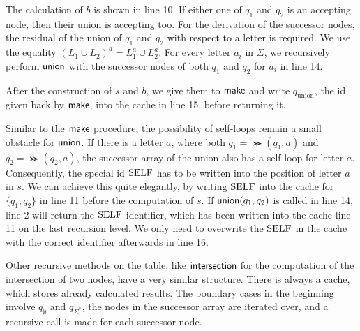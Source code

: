 \par 

The calculation of $b$ is shown in line 10. If either one of $q_{1}$ and $q_{2}$ is an accepting node, then their union is accepting too. For the derivation of the successor nodes, the residual of the union of $q_{1}$ and $q_{2}$ with respect to a letter is required. We use the equality $(L_{1} \cup L_{2})^{a} = L_{1}^{a} \cup L_{2}^{a}$. For every letter $a_{i}$ in $\Sigma$, we recursively perform $\operatorname{\textsf{union}}$ with the successor nodes of both $q_{1}$ and $q_{2}$ for $a_{i}$ in line 14.

\par 

After the construction of $s$ and $b$, we give them to $\operatorname{\textsf{make}}$ and write $q_{\text{union}}$, the id given back by $\operatorname{\textsf{make}}$, into the cache in line 15, before returning it.

\par

Similar to the $\operatorname{\textsf{make}}$ procedure, the possibility of self-loops remain a small obstacle for $\operatorname{\textsf{union}}$. If there is a letter $a$, where both $q_{1} = \Succ(q_{1},a)$ and $q_{2} = \Succ(q_{2},a)$, the successor array of the union also has a self-loop for letter $a$. Consequently, the special id $\mathrm{SELF}$ has to be written into the position of letter $a$ in $s$. We can achieve this quite elegantly, by writing $\mathrm{SELF}$ into the cache for $\{q_{1},q_{2}\}$ in line 11 before the computation of $s$. If $\operatorname{\textsf{union}}(q_{1},q_{2})$ is called in line 14, line 2 will return the $\mathrm{SELF}$ identifier, which has been written into the cache line 11 on the last recursion level. We only need to overwrite the $\mathrm{SELF}$ in the cache with the correct identifier afterwards in line 16.
\par
Other recursive methods on the table, like $\operatorname{\textsf{intersection}}$ for the computation of the intersection of two nodes, have a very similar structure. There is always a cache, which stores already calculated results. The boundary cases in the beginning involve $q_{\emptyset}$ and $q_{\Sigma^{*}}$, the nodes in the successor array are iterated over, and a recursive call is made for each successor node. 


